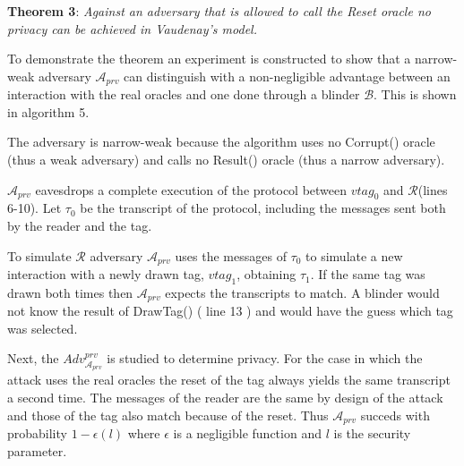     \textbf{Theorem 3}: \textit{Against an adversary that is allowed to call the Reset oracle no privacy can be achieved in Vaudenay's model.}

    To demonstrate the theorem an experiment is constructed to show that a narrow-weak adversary $\mathcal{A}_{prv}$ can distinguish with a non-negligible advantage 
    between an interaction with the real oracles and one done through a blinder $\mathcal{B}$. This is shown in algorithm 5.
    
    The adversary is narrow-weak because the algorithm uses no Corrupt() oracle (thus a weak adversary) and calls no Result() oracle 
    (thus a narrow adversary).

    $\mathcal{A}_{prv}$ eavesdrops a complete execution of the protocol between $vtag_{0}$ and $\mathcal{R}$(lines 6-10). Let $\tau_{0}$ be the transcript of the protocol, including the messages
    sent both by the reader and the tag.

    To simulate $\mathcal{R}$ adversary $\mathcal{A}_{prv}$ uses the messages of $\tau_{0}$ to simulate a new interaction with a newly drawn tag, $vtag_{1}$, obtaining $\tau_{1}$. If the same tag was
    drawn both times then $\mathcal{A}_{prv}$ expects the transcripts to match. A blinder would not know the result of DrawTag() ( line 13 ) and would have the guess which tag was
    selected. 
    
    Next, the $Adv_{\mathcal{A}_{prv}}^{prv}$ is studied to determine privacy. For the case in which the attack uses the real oracles the reset of the tag always yields the same transcript a second time. 
    The messages of the reader are the same by design of the attack and those of the tag also match because of the reset. Thus $\mathcal{A}_{prv}$ succeds with probability $1-\epsilon(l)$
    where $\epsilon$ is a negligible function and $l$ is the security parameter.

